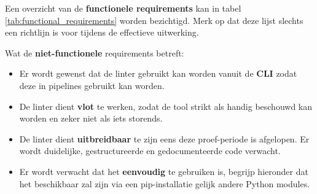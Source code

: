 Een overzicht van de \textbf{functionele requirements} kan in tabel \ref{tab:functional_requirements} worden bezichtigd. Merk op dat deze lijst slechts een richtlijn is voor tijdens de effectieve uitwerking.\newline

Wat de \textbf{niet-functionele} requirements betreft:
\begin{itemize}
    \item Er wordt gewenst dat de linter gebruikt kan worden vanuit de \textbf{\acrshort{CLI}} zodat deze in pipelines gebruikt kan worden.
    \item De linter dient \textbf{vlot} te werken, zodat de tool strikt als handig beschouwd kan worden en zeker niet als iets storends.
    \item De linter dient \textbf{uitbreidbaar} te zijn eens deze proef-periode is afgelopen. Er wordt duidelijke, gestructureerde en gedocumenteerde code verwacht.
    \item Er wordt verwacht dat het \textbf{eenvoudig} te gebruiken is, begrijp hieronder dat het beschikbaar zal zijn via een pip-installatie gelijk andere Python modules.
\end{itemize}

